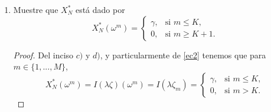 \documentclass[letterpaper]{article}
\newcommand{\E}{\mathbb{E}}
\newcommand{\1}{\mathds{1}}
\theoremstyle{definition}
\theoremstyle{definition}
\theoremstyle{definition}
\theoremstyle{definition}
\theoremstyle{definition}
\begin{document}
\begin{enumerate}
\begin{enumerate}
\begin{proof}
        Por lo tanto, 
        \[
        X_0=\E\left[\zeta \left(\lambda\zeta\right)\right]=\sum_{m=1}^{M}\zeta_mI(\lambda\zeta_m)p_m=\sum_{m=1}^{K}\zeta_mI(\zeta_m\lambda)p_m=\sum_{m=1}^{K}\zeta_m\gamma p_m,   
        \]
        de donde se sigue que 
        \[
        \sum_{m=1}^{K}\zeta_mp_m=\frac{X_0}{\gamma}.    
        \]
        De manera contraria, si se tiene que existe $K\in \{1,...,M\}$ tal que 
        \[
        \sum_{m=1}^{K}\zeta_mp_m=\frac{X_0}{\gamma},    
        \]
        con $\zeta_K<\zeta_{K+1}$, entonces podemos elegir $\lambda>0$ una constante positiva
        tal que 
        \[
        \lambda\zeta_K<\frac{1}{\gamma},
        \]
        de tal forma que, como $\lambda\zeta_K\leq \frac{1}{\gamma}<\lambda\zeta_{K+1}$, con lo 
        que $I \left(\lambda\zeta_K\right)=\gamma$ y por el orden en los $\zeta_m$, se tiene que 
        \begin{equation}
        I(\lambda\zeta_m)=\begin{cases}\label{ec2}
            \gamma, & \text{si } \lambda\zeta_m\leq \frac{1}{\gamma} \Longleftrightarrow m\leq K,\\
            0, & \text{si } \lambda\zeta_m > \frac{1}{\gamma} \Longleftrightarrow m>K.
        \end{cases}    
        \end{equation}
        Por lo que 
        \[
        X_0=\sum_{m=1}^{K}\zeta_m\gamma p_m=\sum_{m=1}^K\zeta_mI(\lambda\zeta_m)p_m=\sum_{m=1}^M\zeta_mI(\lambda\zeta_m)p_m=\E\left[\zeta I(\lambda\zeta)\right]=\E\left[\frac{Z_N}{(1+r)^N}I \left(\frac{\lambda Z_N}{(1+r)^N}\right)\right],
        \]
        y concluimos que $\lambda$ es solución de 
        \[
            \E\left[\frac{Z_N}{(1+r)^N}I \left(\frac{\lambda Z_N}{(1+r)^N}\right)\right]=X_0.    
        \]

     \end{proof}
    \item Muestre que $X_N^*$ está dado por 
    \[
    X_N^{*}(\omega^{m})=\begin{cases}
        \gamma, & \text{si }m\leq K,\\
        0, & \text{si } m\geq K+1.
    \end{cases}    
    \]
    \begin{proof} 
       Del inciso $c)$ y $d)$, y particularmente de \eqref{ec2} tenemos que para $m\in \{1,...,M\}$, 
       \[
       X_N^{*}(\omega^{m})=I(\lambda\zeta)(\omega^{m})=I(\lambda\zeta_m)=\begin{cases}
        \gamma, & \text{si } m\leq K,\\
        0, & \text{si } m>K.
       \end{cases} 
       \]
     \end{proof}
    \end{enumerate}
\end{enumerate}
\end{document}
